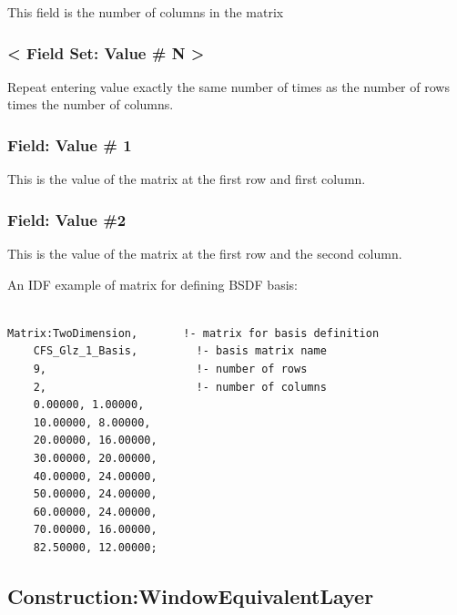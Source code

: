 This field is the number of columns in the matrix

\subsubsection{\textless{} Field Set: Value \# N \textgreater{}}\label{field-set-value-n}

Repeat entering value exactly the same number of times as the number of rows times the number of columns.

\subsubsection{Field: Value \# 1}\label{field-value-1-000}

This is the value of the matrix at the first row and first column.

\subsubsection{Field: Value \#2}\label{field-value-2}

This is the value of the matrix at the first row and the second column.

An IDF example of matrix for defining BSDF basis:

\begin{lstlisting}

Matrix:TwoDimension,       !- matrix for basis definition
    CFS_Glz_1_Basis,         !- basis matrix name
    9,                       !- number of rows
    2,                       !- number of columns
    0.00000, 1.00000,
    10.00000, 8.00000,
    20.00000, 16.00000,
    30.00000, 20.00000,
    40.00000, 24.00000,
    50.00000, 24.00000,
    60.00000, 24.00000,
    70.00000, 16.00000,
    82.50000, 12.00000;
\end{lstlisting}

\subsection{Construction:WindowEquivalentLayer}\label{constructionwindowequivalentlayer}

